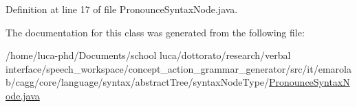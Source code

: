 Definition at line 17 of file Pronounce\-Syntax\-Node.\-java.



The documentation for this class was generated from the following file\-:\begin{DoxyCompactItemize}
\item 
/home/luca-\/phd/\-Documents/school luca/dottorato/research/verbal interface/speech\-\_\-workspace/concept\-\_\-action\-\_\-grammar\-\_\-generator/src/it/emarolab/cagg/core/language/syntax/abstract\-Tree/syntax\-Node\-Type/\hyperlink{PronounceSyntaxNode_8java}{Pronounce\-Syntax\-Node.\-java}\end{DoxyCompactItemize}
